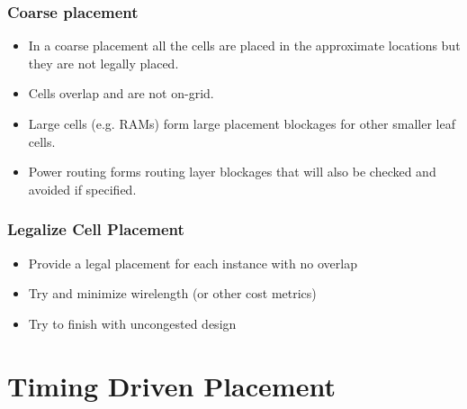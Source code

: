 \documentclass[compress]{beamer}
\begin{document}
\begin{frame}
	\frametitle{Coarse placement}
	\begin{center}
	\end{center}
\begin{itemize}
	\item In a coarse placement all the cells are placed in the approximate locations but they are not legally placed. 
	\item Cells overlap and are not on-grid. 
	\item Large cells (e.g. RAMs) form large placement blockages for other smaller leaf cells. 
	\item Power routing forms routing layer blockages that will also be checked and avoided if specified.
	
\end{itemize}
\end{frame}

\begin{frame}
	\frametitle{Legalize Cell Placement}
	\begin{center}
	\end{center}
\begin{itemize}
	\item Provide a legal placement for each instance with no overlap
	\item Try and minimize wirelength (or other cost metrics)
	\item Try to finish with uncongested design
\end{itemize}
\end{frame}

\section[TDP]{Timing Driven Placement}
\end{document}
